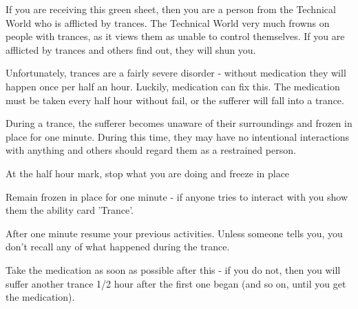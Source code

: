 \documentclass[green]{guildcamp3}
\begin{document}
	
	\name{\gTrance{}}
	
	
	
	
	If you are receiving this green sheet, then you are a person from the Technical World who is afflicted by trances. The Technical World very much frowns on people with trances, as it views them as unable to control themselves. If you are afflicted by trances and others find out, they will shun you. 
	
	Unfortunately, trances are a fairly severe disorder - without medication they will happen once per half an hour. Luckily, medication can fix this. The medication must be taken every half hour without fail, or the sufferer will fall into a trance. 
	
	During a trance, the sufferer becomes unaware of their surroundings and frozen in place for one minute. During this time, they may have no intentional interactions with anything and others should regard them as a restrained person. 
	
	
	\begin{enum}
		\item At the half hour mark, stop what you are doing and freeze in place
		\item Remain frozen in place for one minute - if anyone tries to interact with you show them the ability card 'Trance'. 
		\item After one minute resume your previous activities. Unless someone tells you, you don't recall any of what happened during the trance.
		\item Take the medication as soon as possible after this - if you do not, then you will suffer another trance 1/2 hour after the first one began (and so on, until you get the medication).
	\end{enum}
	
	
\end{document}
